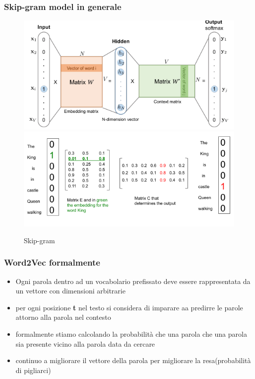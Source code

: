 \subsubsection{Skip-gram model in generale}


\begin{figure}[H]
    \centering
    \includegraphics[width=0.7\linewidth]{imgs/skip-gram-model}
    \includegraphics[width=0.7\linewidth]{imgs/skip-gram2}
    \caption{Skip-gram}
    \label{fig:Skip-gram}
\end{figure}



\subsubsection{Word2Vec formalmente}
\begin{itemize}
    \item Ogni parola dentro ad un vocabolario prefissato deve essere rappresentata
    da un vettore con dimensioni arbitrarie
    \item per ogni posizione \textbf{t} nel testo si considera di imparare aa predirre
    le parole attorno alla parola nel contesto
    \item formalmente stiamo calcolando la probabilità che una parola che una parola
    sia presente vicino alla parola data da cercare
    \item continuo a migliorare il vettore della parola per migliorare la resa(probabilità di pigliarci)
\end{itemize}





































